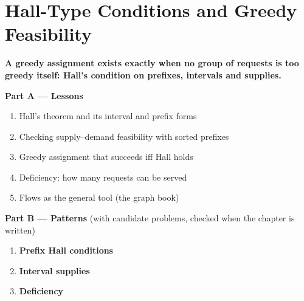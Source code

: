 \chapter{Hall-Type Conditions and Greedy Feasibility}
\label{ch:hall}

\begin{tcolorbox}[enhanced, colback=white, colframe=secondaryblue, boxrule=1pt, arc=2mm]
\textbf{\large\textcolor{primaryblue}{A greedy assignment exists exactly when no group of requests is too greedy itself: Hall's condition on prefixes, intervals and supplies.}}
\end{tcolorbox}


\begin{plannedbox}
\textbf{Part A --- Lessons}
\begin{enumerate}[leftmargin=*, label=\textbf{A\arabic*.}, itemsep=1pt]
    \item Hall's theorem and its interval and prefix forms
    \item Checking supply--demand feasibility with sorted prefixes
    \item Greedy assignment that succeeds iff Hall holds
    \item Deficiency: how many requests can be served
    \item Flows as the general tool (the graph book)
\end{enumerate}
\textbf{Part B --- Patterns} (with candidate problems, checked when the chapter is written)
\begin{enumerate}[leftmargin=*, label=\textbf{P\arabic*.}, itemsep=1pt]
    \item \textbf{Prefix Hall conditions}
    \item \textbf{Interval supplies}
    \item \textbf{Deficiency}
\end{enumerate}
\end{plannedbox}
